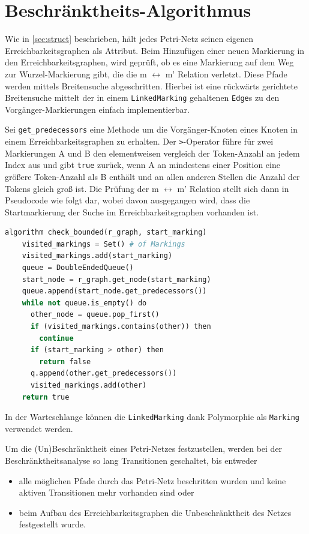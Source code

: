 \section{Beschränktheits-Algorithmus}
\label{sec:algo}
Wie in \cref{sec:struct} beschrieben, hält jedes Petri-Netz seinen eigenen
Erreichbarkeitsgraphen als Attribut. Beim Hinzufügen einer neuen Markierung in
den Erreichbarkeitsgraphen, wird geprüft, ob es eine Markierung auf dem Weg zur
Wurzel-Markierung gibt, die die m $\leftrightarrow$ m' Relation verletzt. Diese
Pfade werden mittels Breitensuche abgeschritten. Hierbei ist eine rückwärts
gerichtete Breitensuche mittelt der in einem \texttt{LinkedMarking} gehaltenen
\texttt{Edge}s zu den Vorgänger-Markierungen einfach implementierbar.

Sei \texttt{get\_predecessors} eine Methode um die Vorgänger-Knoten eines Knoten
in einem Erreichbarkeitsgraphen zu erhalten. Der \texttt{\textgreater}-Operator
führe für zwei Markierungen A und B den elementweisen vergleich der Token-Anzahl
an jedem Index aus und gibt \texttt{true} zurück, wenn A an mindestens einer
Position eine größere Token-Anzahl als B enthält und an allen anderen Stellen
die Anzahl der Tokens gleich groß ist. %
Die Prüfung der m $\leftrightarrow$ m' Relation stellt
sich dann in Pseudocode wie folgt dar, wobei davon ausgegangen wird, dass die
Startmarkierung der Suche im Erreichbarkeitsgraphen vorhanden ist.

\begin{lstlisting}[language=python, morekeywords={do, algorithm, then}]
  algorithm check_bounded(r_graph, start_marking)
    visited_markings = Set() # of Markings
    visited_markings.add(start_marking)
    queue = DoubleEndedQueue()
    start_node = r_graph.get_node(start_marking)
    queue.append(start_node.get_predecessors())
    while not queue.is_empty() do
      other_node = queue.pop_first()
      if (visited_markings.contains(other)) then
        continue
      if (start_marking > other) then
        return false
      q.append(other.get_predecessors())
      visited_markings.add(other)
    return true
\end{lstlisting}

In der Warteschlange können die \texttt{LinkedMarking} dank Polymorphie als
\texttt{Marking} verwendet werden.

Um die (Un)Beschränktheit eines Petri-Netzes festzustellen, werden bei der
Beschränktheitsanalyse so lang Transitionen geschaltet, bis entweder
\begin{itemize}
  \item alle möglichen Pfade durch das Petri-Netz beschritten wurden und keine
        aktiven Transitionen mehr vorhanden sind oder
  \item beim Aufbau des Erreichbarkeitsgraphen die Unbeschränktheit des Netzes
        festgestellt wurde.
\end{itemize}

